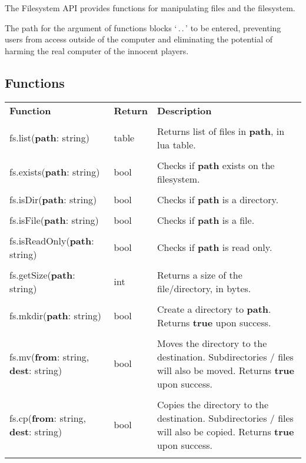 The Filesystem API provides functions for manipulating files and the filesystem.

The path for the argument of functions blocks `\,.\,.\,' to be entered, preventing users from access outside of the computer and eliminating the potential of harming the real computer of the innocent players.

\subsection{Functions}

\begin{tabularx}{\textwidth}{l l X}
	\textbf{\large Function} & \textbf{\large Return} & \textbf{\large Description}
	\\ \\
	\endhead
	fs.list(\textbf{path}: string) & table & Returns list of files in \textbf{path}, in lua table.
	\\ \\
	fs.exists(\textbf{path}: string) & bool & Checks if \textbf{path} exists on the filesystem.
	\\ \\
	fs.isDir(\textbf{path}: string) & bool & Checks if \textbf{path} is a directory.
	\\ \\
	fs.isFile(\textbf{path}: string) & bool & Checks if \textbf{path} is a file.
	\\ \\
	fs.isReadOnly(\textbf{path}: string) & bool & Checks if \textbf{path} is read only.
	\\ \\
	fs.getSize(\textbf{path}: string) & int & Returns a size of the file/directory, in bytes.
	\\ \\
	fs.mkdir(\textbf{path}: string) & bool & Create a directory to \textbf{path}. Returns \textbf{true} upon success.
	\\ \\
	fs.mv(\textbf{from}: string, \textbf{dest}: string) & bool & Moves the directory to the destination. Subdirectories / files will also be moved. Returns \textbf{true} upon success.
	\\ \\
	fs.cp(\textbf{from}: string, \textbf{dest}: string) & bool & Copies the directory to the destination. Subdirectories / files will also be copied. Returns \textbf{true} upon success.
	\\ \\

\end{tabularx}
